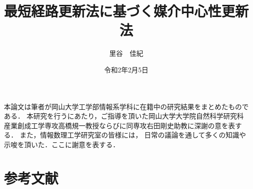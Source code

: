 \documentclass[11pt]{jreport}
\title{最短経路更新法に基づく媒介中心性更新法}
\author{里谷　佳紀}
\date{令和2年2月5日} %
\theoremstyle{mythmstyle}
\begin{document}
\maketitle








\acknowledgment
本論文は筆者が岡山大学工学部情報系学科に在籍中の研究結果をまとめたものである．
本研究を行うにあたり，ご指導を頂いた岡山大学大学院自然科学研究科
産業創成工学専攻高橋規一教授ならびに同専攻右田剛史助教に深謝の意を表する．
また，情報数理工学研究室の皆様には，
日常の議論を通して多くの知識や示唆を頂いた．ここに謝意を表する．

\chapter*{参考文献}
\makeatletter
{}
\makeatother
\printbibliography[heading=none]
\end{document}
